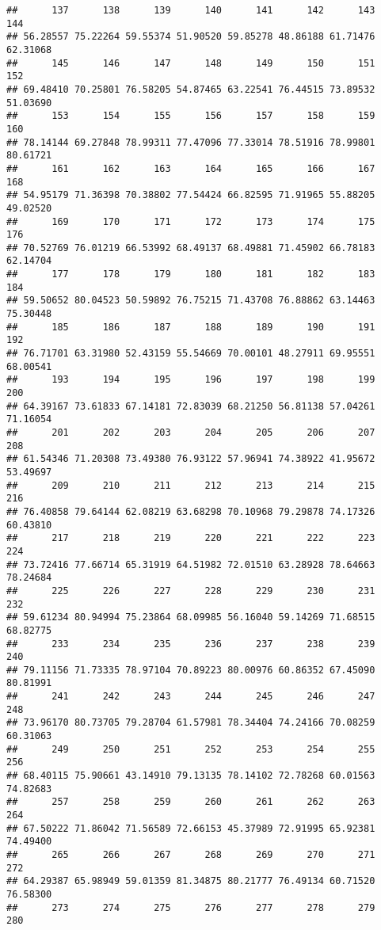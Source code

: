 \documentclass[
]{article}
\begin{document}
\begin{verbatim}
##      137      138      139      140      141      142      143      144 
## 56.28557 75.22264 59.55374 51.90520 59.85278 48.86188 61.71476 62.31068 
##      145      146      147      148      149      150      151      152 
## 69.48410 70.25801 76.58205 54.87465 63.22541 76.44515 73.89532 51.03690 
##      153      154      155      156      157      158      159      160 
## 78.14144 69.27848 78.99311 77.47096 77.33014 78.51916 78.99801 80.61721 
##      161      162      163      164      165      166      167      168 
## 54.95179 71.36398 70.38802 77.54424 66.82595 71.91965 55.88205 49.02520 
##      169      170      171      172      173      174      175      176 
## 70.52769 76.01219 66.53992 68.49137 68.49881 71.45902 66.78183 62.14704 
##      177      178      179      180      181      182      183      184 
## 59.50652 80.04523 50.59892 76.75215 71.43708 76.88862 63.14463 75.30448 
##      185      186      187      188      189      190      191      192 
## 76.71701 63.31980 52.43159 55.54669 70.00101 48.27911 69.95551 68.00541 
##      193      194      195      196      197      198      199      200 
## 64.39167 73.61833 67.14181 72.83039 68.21250 56.81138 57.04261 71.16054 
##      201      202      203      204      205      206      207      208 
## 61.54346 71.20308 73.49380 76.93122 57.96941 74.38922 41.95672 53.49697 
##      209      210      211      212      213      214      215      216 
## 76.40858 79.64144 62.08219 63.68298 70.10968 79.29878 74.17326 60.43810 
##      217      218      219      220      221      222      223      224 
## 73.72416 77.66714 65.31919 64.51982 72.01510 63.28928 78.64663 78.24684 
##      225      226      227      228      229      230      231      232 
## 59.61234 80.94994 75.23864 68.09985 56.16040 59.14269 71.68515 68.82775 
##      233      234      235      236      237      238      239      240 
## 79.11156 71.73335 78.97104 70.89223 80.00976 60.86352 67.45090 80.81991 
##      241      242      243      244      245      246      247      248 
## 73.96170 80.73705 79.28704 61.57981 78.34404 74.24166 70.08259 60.31063 
##      249      250      251      252      253      254      255      256 
## 68.40115 75.90661 43.14910 79.13135 78.14102 72.78268 60.01563 74.82683 
##      257      258      259      260      261      262      263      264 
## 67.50222 71.86042 71.56589 72.66153 45.37989 72.91995 65.92381 74.49400 
##      265      266      267      268      269      270      271      272 
## 64.29387 65.98949 59.01359 81.34875 80.21777 76.49134 60.71520 76.58300 
##      273      274      275      276      277      278      279      280 

\end{verbatim}
\end{document}
